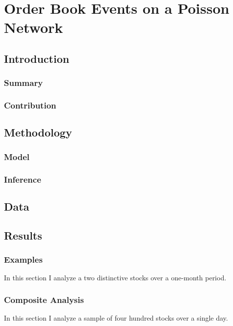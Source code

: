 \chapter{Order Book Events on a Poisson Network}
\label{chapter:four}

\section{Introduction}

\subsection{Summary}

\subsection{Contribution}

\section{Methodology}

\subsection{Model}

\subsection{Inference}

\section{Data}

\section{Results}

\subsection{Examples}
In this section I analyze a two distinctive stocks over a one-month period.

\subsection{Composite Analysis}
In this section I analyze a sample of four hundred stocks over a single day.

